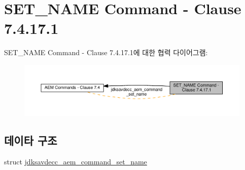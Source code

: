 \hypertarget{group__command__set__name}{}\section{S\+E\+T\+\_\+\+N\+A\+ME Command -\/ Clause 7.4.17.1}
\label{group__command__set__name}
S\+E\+T\+\_\+\+N\+A\+ME Command -\/ Clause 7.4.17.1에 대한 협력 다이어그램\+:
\nopagebreak
\begin{figure}[H]
\begin{center}
\leavevmode
\includegraphics[width=350pt]{group__command__set__name}
\end{center}
\end{figure}
\subsection*{데이타 구조}
\begin{DoxyCompactItemize}
\item 
struct \hyperlink{structjdksavdecc__aem__command__set__name}{jdksavdecc\+\_\+aem\+\_\+command\+\_\+set\+\_\+name}
\end{DoxyCompactItemize}
